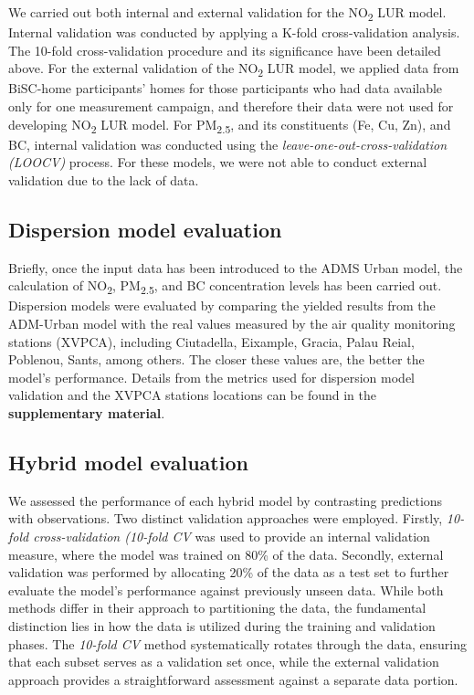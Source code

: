 \documentclass{article}
\begin{document}
We carried out both internal and external validation for the NO\textsubscript{2} LUR model. Internal validation was conducted by applying a K-fold cross-validation analysis. The 10-fold cross-validation procedure and its significance have been detailed above. For the external validation of the NO\textsubscript{2} LUR model, we applied data from BiSC-home participants' homes for those participants who had data available only for one measurement campaign, and therefore their data were not used for developing NO\textsubscript{2} LUR model. For PM\textsubscript{2.5}, and its constituents (Fe, Cu, Zn), and BC, internal validation was conducted using the \textit{leave-one-out-cross-validation (LOOCV)} process. For these models, we were not able to conduct external validation due to the lack of data.

\subsection{Dispersion model evaluation}
 Briefly, once the input data has been introduced to the ADMS Urban model, the calculation of NO\textsubscript{2}, PM\textsubscript{2.5}, and BC concentration levels has been carried out. Dispersion models were evaluated by comparing the yielded results from the ADM-Urban model with the real values measured by the air quality monitoring stations (XVPCA), including Ciutadella, Eixample, Gracia, Palau Reial, Poblenou, Sants, among others. The closer these values are, the better the model's performance.  Details from the metrics used for dispersion model validation and the XVPCA stations locations can be found in the \textbf{supplementary material}.\vspace{0.5cm}

\subsection{Hybrid model evaluation}
We assessed the performance of each hybrid model by contrasting predictions with observations. Two distinct validation approaches were employed. Firstly, \textit{10-fold cross-validation (10-fold CV} was used to provide an internal validation measure, where the model was trained on 80\% of the data. Secondly, external validation was performed by allocating 20\% of the data as a test set to further evaluate the model's performance against previously unseen data. While both methods differ in their approach to partitioning the data, the fundamental distinction lies in how the data is utilized during the training and validation phases. The \textit{10-fold CV} method systematically rotates through the data, ensuring that each subset serves as a validation set once, while the external validation approach provides a straightforward assessment against a separate data portion. 
\end{document}
